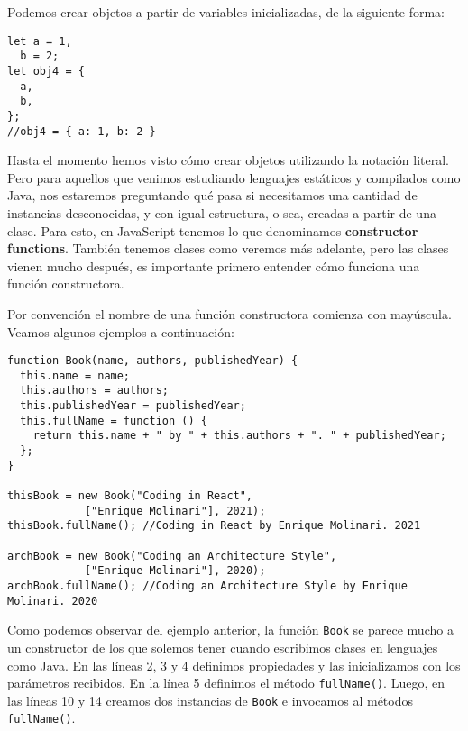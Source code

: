 \documentclass[a4paper, oneside, titlepage, 12pt]{paper}
\begin{document}
Podemos crear objetos a partir de variables inicializadas, de la siguiente forma:

\begin{verbatim}
let a = 1,
  b = 2;
let obj4 = {
  a,
  b,
};
//obj4 = { a: 1, b: 2 }	
\end{verbatim}

Hasta el momento hemos visto cómo crear objetos utilizando la notación literal. Pero para aquellos que venimos estudiando lenguajes estáticos y compilados como Java, nos estaremos preguntando qué pasa si necesitamos una cantidad de instancias desconocidas, y con igual estructura, o sea, creadas a partir de una clase. Para esto, en JavaScript tenemos lo que denominamos \textbf{constructor functions}. También tenemos clases como veremos más adelante, pero las clases vienen mucho después, es importante primero entender cómo funciona una función constructora.
\newline

Por convención el nombre de una función constructora comienza con mayúscula. Veamos algunos ejemplos a continuación:

\begin{verbatim}
function Book(name, authors, publishedYear) {
  this.name = name;
  this.authors = authors;
  this.publishedYear = publishedYear;
  this.fullName = function () {
    return this.name + " by " + this.authors + ". " + publishedYear;
  };
}

thisBook = new Book("Coding in React", 
			["Enrique Molinari"], 2021);
thisBook.fullName(); //Coding in React by Enrique Molinari. 2021

archBook = new Book("Coding an Architecture Style", 
			["Enrique Molinari"], 2020);
archBook.fullName(); //Coding an Architecture Style by Enrique Molinari. 2020 
\end{verbatim}

Como podemos observar del ejemplo anterior, la función \texttt{Book} se parece mucho a un constructor de los que solemos tener cuando escribimos clases en lenguajes como Java. En las líneas 2, 3 y 4 definimos propiedades y las inicializamos con los parámetros recibidos. En la línea 5 definimos el método \texttt{fullName()}. Luego, en las líneas 10 y 14 creamos dos instancias de \texttt{Book} e invocamos al métodos \texttt{fullName()}. 
\end{document}
